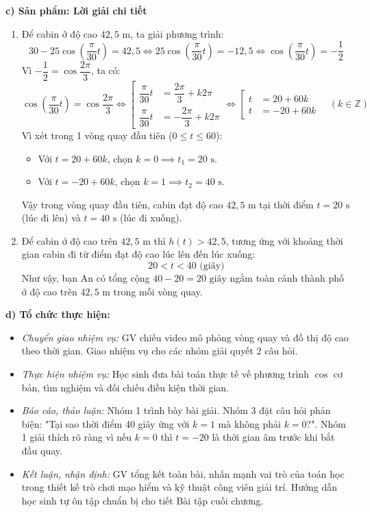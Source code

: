 \documentclass[12pt, a4paper]{article}
\begin{document}
\noindent \textbf{c) Sản phẩm: Lời giải chi tiết}  
\begin{enumerate}[leftmargin=0.6cm]  
    \item Để cabin ở độ cao $42{,}5\text{ m}$, ta giải phương trình:  
    $$30 - 25\cos\left(\dfrac{\pi}{30}t\right) = 42{,}5 \iff 25\cos\left(\dfrac{\pi}{30}t\right) = -12{,}5 \iff \cos\left(\dfrac{\pi}{30}t\right) = -\dfrac{1}{2}$$  
    Vì $-\dfrac{1}{2} = \cos\dfrac{2\pi}{3}$, ta có:  
    $$\cos\left(\dfrac{\pi}{30}t\right) = \cos\dfrac{2\pi}{3} \iff \left[\begin{aligned} \dfrac{\pi}{30}t &= \dfrac{2\pi}{3} + k2\pi \\ \dfrac{\pi}{30}t &= -\dfrac{2\pi}{3} + k2\pi \end{aligned}\right. \iff \left[\begin{aligned} t &= 20 + 60k \\ t &= -20 + 60k \end{aligned}\right. \quad (k \in \mathbb{Z})$$  
    Vì xét trong 1 vòng quay đầu tiên ($0 \le t \le 60$):  
    \begin{itemize}  
        \item Với $t = 20 + 60k$, chọn $k = 0 \implies t_1 = 20\text{ s}$.  
        \item Với $t = -20 + 60k$, chọn $k = 1 \implies t_2 = 40\text{ s}$.  
    \end{itemize}  
    Vậy trong vòng quay đầu tiên, cabin đạt độ cao $42{,}5\text{ m}$ tại thời điểm $t = 20\text{ s}$ (lúc đi lên) và $t = 40\text{ s}$ (lúc đi xuống).  
    \item Để cabin ở độ cao trên $42{,}5\text{ m}$ thì $h(t) > 42{,}5$, tương ứng với khoảng thời gian cabin đi từ điểm đạt độ cao lúc lên đến lúc xuống:  
    $$20 < t < 40\text{ (giây)}$$  
    Như vậy, bạn An có tổng cộng $40 - 20 = 20\text{ giây}$ ngắm toàn cảnh thành phố ở độ cao trên $42{,}5\text{ m}$ trong mỗi vòng quay.  
\end{enumerate}  
  
\noindent \textbf{d) Tổ chức thực hiện:}  
\begin{itemize}[leftmargin=0.8cm]  
    \item \textit{Chuyển giao nhiệm vụ:} GV chiếu video mô phỏng vòng quay và đồ thị độ cao theo thời gian. Giao nhiệm vụ cho các nhóm giải quyết 2 câu hỏi.  
    \item \textit{Thực hiện nhiệm vụ:} Học sinh đưa bài toán thực tế về phương trình $\cos$ cơ bản, tìm nghiệm và đối chiếu điều kiện thời gian.  
    \item \textit{Báo cáo, thảo luận:} Nhóm 1 trình bày bài giải. Nhóm 3 đặt câu hỏi phản biện: "Tại sao thời điểm 40 giây ứng với $k = 1$ mà không phải $k = 0$?". Nhóm 1 giải thích rõ ràng vì nếu $k = 0$ thì $t = -20$ là thời gian âm trước khi bắt đầu quay.  
    \item \textit{Kết luận, nhận định:} GV tổng kết toàn bài, nhấn mạnh vai trò của toán học trong thiết kế trò chơi mạo hiểm và kỹ thuật công viên giải trí. Hướng dẫn học sinh tự ôn tập chuẩn bị cho tiết Bài tập cuối chương.  
\end{itemize}  
  
\end{document}
